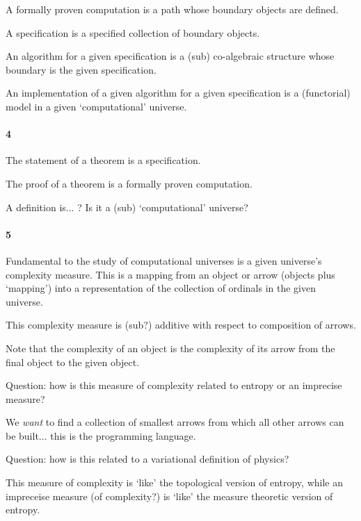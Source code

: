 A formally proven computation is a path whose boundary objects are defined.

A specification is a specified collection of boundary objects.

An algorithm for a given specification is a (sub) co-algebraic structure whose
boundary is the given specification.

An implementation of a given algorithm for a given specification is a
(functorial) model in a given `computational' universe.

\paragraph{4}

The statement of a theorem is a specification.

The proof of a theorem is a formally proven computation.

A definition is... ? Is it a (sub) `computational' universe?

\paragraph{5}

Fundamental to the study of computational universes is a given universe's
complexity measure. This is a mapping from an object or arrow (objects plus
`mapping') into a representation of the collection of ordinals in the given
universe.

This complexity measure is (sub?) additive with respect to composition of
arrows.

Note that the complexity of an object is the complexity of its arrow from the
final object to the given object.

Question: how is this measure of complexity related to entropy or an imprecise
measure?

We \emph{want} to find a collection of smallest arrows from which all other
arrows can be built... this is the programming language.

Question: how is this related to a variational definition of physics?

This measure of complexity is `like' the topological version of entropy, while
an impreceise measure (of complexity?) is `like' the measure theoretic version
of entropy.